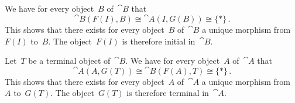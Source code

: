 \subsection{}

We have for every object~$B$ of~$\cat{B}$ that
\[
	\cat{B}(F(I), B)
	≅
	\cat{A}(I, G(B))
	≅
	\{ * \} \,.
\]
This shows that there exists for every object~$B$ of~$\cat{B}$ a unique morphism from~$F(I)$ to~$B$.
The object~$F(I)$ is therefore initial in~$\cat{B}$.

Let~$T$ be a terminal object of~$\cat{B}$.
We have for every object~$A$ of~$\cat{A}$ that
\[
	\cat{A}(A, G(T))
	≅
	\cat{B}(F(A), T)
	≅
	\{ * \} \,.
\]
This shows that there exists for every object~$A$ of~$\cat{A}$ a unique morphism from~$A$ to~$G(T)$.
The object~$G(T)$ is therefore terminal in~$\cat{A}$.
